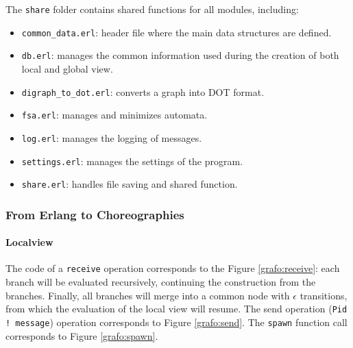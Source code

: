 \noindent The \texttt{share} folder contains shared functions for all modules, including:  
\begin{itemize}  
  \item \texttt{common\_data.erl}: header file where the main data structures are defined.  
  \item \texttt{db.erl}: manages the common information used during the creation
  of both local and global view.  
  \item \texttt{digraph\_to\_dot.erl}: converts a graph into DOT format.  
  \item \texttt{fsa.erl}: manages and minimizes automata.  
  \item \texttt{log.erl}: manages the logging of messages.  
  \item \texttt{settings.erl}: manages the settings of the program.  
  \item \texttt{share.erl}: handles file saving and shared function.  
\end{itemize}  

\subsubsection{From Erlang to Choreographies}
\label{sec:corrisp}

\paragraph{Localview}

The code of a \texttt{receive} operation corresponds to the Figure \ref{grafo:receive}:
each branch will be evaluated recursively, continuing the construction from the 
branches. Finally, all branches will merge into a common node with $\epsilon$ 
transitions, from which the evaluation of the local view will resume.  
The send operation (\texttt{Pid ! message}) operation corresponds to Figure \ref{grafo:send}.  
The \texttt{spawn} function call corresponds to Figure \ref{grafo:spawn}.  

\bigskip

